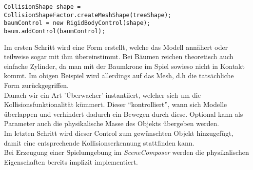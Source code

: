 \begin{lstlisting}
CollisionShape shape = CollisionShapeFactor.createMeshShape(treeShape);
baumControl = new RigidBodyControl(shape);
baum.addControl(baumControl);
\end{lstlisting} Im ersten Schritt wird eine Form erstellt, welche das Modell annähert oder teilweise sogar mit ihm übereinstimmt. Bei Bäumen reichen theoretisch auch einfache Zylinder, da man mit der Baumkrone im Spiel sowieso nicht in Kontakt kommt. Im obigen Beispiel wird allerdings auf das Mesh, d.h  die tatsächliche Form zurückgegriffen.\\
Danach wir ein Art 'Überwacher' instantiiert, welcher sich um die Kollisionsfunktionalität kümmert. Dieser \enquote{kontrolliert}, wann sich Modelle überlappen und verhindert dadurch ein Bewegen durch diese. Optional kann als Parameter auch die physikalische Masse des Objekts übergeben werden.\\
Im letzten Schritt wird dieser Control zum gewünschten Objekt hinzugefügt, damit eine entsprechende Kollisionserkennung stattfinden kann.\\
Bei Erzeugung einer Spielumgebung im \emph{SceneComposer} werden die physikalischen Eigenschaften bereits implizit implementiert.


